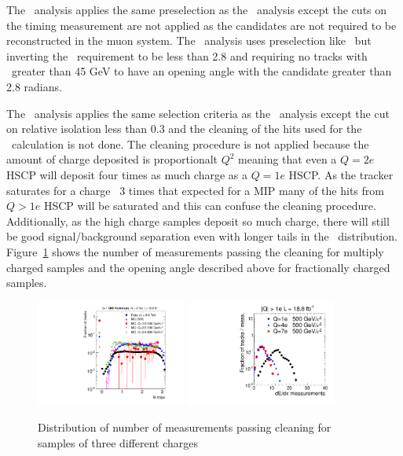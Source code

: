 The \tkonly\ analysis applies the same preselection as the \tktof\ analysis except the cuts on the timing measurement are not applied as the candidates
are not required to be reconstructed in the muon system. The \fract\ analysis uses preselection like \tkonly\ but inverting the \ih\ requirement
to be less than 2.8 and requiring no tracks with \pt\ greater than 45 GeV to have an opening angle with the candidate greater than 2.8 radians.

The \multi\ analysis applies
the same selection criteria as the \tktof\ analysis except the cut on relative isolation less than 0.3 and the cleaning of the hits used for the \dedx\ calculation
is not done. The cleaning procedure is not applied because the amount of charge deposited is proportionalt $Q^2$ meaning that even a $Q=2e$ HSCP will
deposit four times as much charge as a $Q=1e$ HSCP. As the tracker saturates for a charge ~3 times that expected for a MIP many of the hits from $Q>1e$ HSCP
will be saturated and this can confuse the cleaning procedure. Additionally, as the high charge samples deposit so much charge, 
there will still be good signal/background separation even with longer tails in the \dedx\ distribution.
Figure~\ref{fig:TkMuPreselC} shows the number of measurements passing the cleaning for multiply charged samples and the opening
angle described above for fractionally charged samples.

\begin{figure}
\centering
  \includegraphics[clip=true, trim=0.0cm 0cm 2.8cm 0cm, width=0.44\textwidth]{figures/fract/Selection_Comp_8TeV_DY_OpenAngle_BS}
  \includegraphics[clip=true, trim=0.0cm 0cm 2.8cm 0cm, width=0.44\textwidth]{figures/multi/Selection_Comp_8TeV_DY_QG_NOM_BS}
  \caption{Distribution of number of measurements passing cleaning for samples of three different charges
    \label{fig:TkMuPreselC}}
\end{figure}

